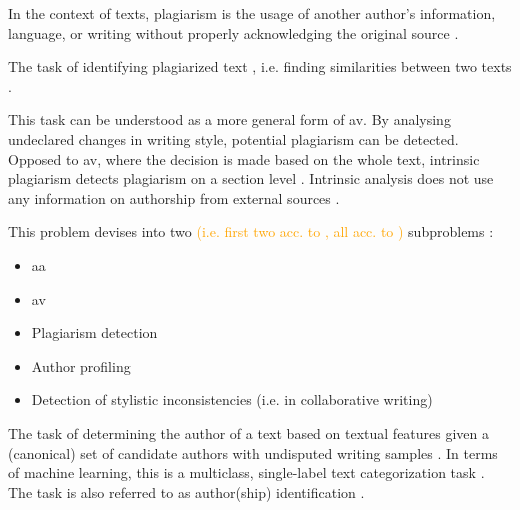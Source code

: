 \begin{definition}
    [Plagiarism]
    In the context of texts, plagiarism is the usage of another author's information, language, or writing without properly acknowledging the original source \cite{stein_intrinsic_2011}.
\end{definition}

\begin{definition}
    The task of identifying plagiarized text \cite{stein_intrinsic_2011}, i.e. finding similarities between two texts \cite{stamatatos_survey_2009}.
\end{definition}

\begin{definition}
    This task can be understood as a more general form of \ac{av}.
    By analysing undeclared changes in writing style, potential plagiarism can be detected.
    Opposed to \ac{av}, where the decision is made based on the whole text, 
    intrinsic plagiarism detects plagiarism on a section level \cite{stein_intrinsic_2011}.
    Intrinsic analysis does not use any information on authorship from external sources \cite{zangerle_overview_2024}.
\end{definition}

\begin{definition}
    This problem devises into two \textcolor{orange}{(i.e. first two acc. to \cite{stein_intrinsic_2011}, all acc. to \cite{stamatatos_survey_2009})} subproblems \cite{stein_intrinsic_2011}:
    \begin{itemize}
        \item \ac{aa} \cite{stein_intrinsic_2011}
        \item \ac{av} \cite{stein_intrinsic_2011,stamatatos_survey_2009}
        \item Plagiarism detection \cite{stamatatos_survey_2009}
        \item Author profiling \cite{stamatatos_survey_2009}
        \item Detection of stylistic inconsistencies (i.e. in collaborative writing) \cite{stamatatos_survey_2009}
    \end{itemize}
\end{definition}

\begin{definition}
    [\ac{aa}]   %
    The task of determining the author of a text based on textual features 
    given a (canonical) set of candidate authors with undisputed writing samples \cite{stein_intrinsic_2011,stamatatos_survey_2009,tyo_state_2022,bischoff_importance_2020}.
    In terms of machine learning, this is a multiclass, single-label text categorization task \cite{stamatatos_survey_2009}.
    The task is also referred to as author(ship) identification \cite{stamatatos_survey_2009}.
\end{definition}


